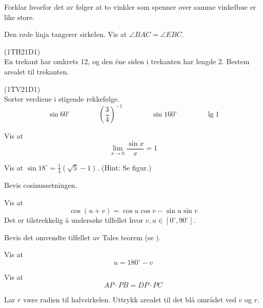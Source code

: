 Forklar hvorfor det av  følger at to vinkler som spenner over samme vinkelbue er like store.

 \vs
{}

\newpage
{}
Den røde linja tangerer sirkelen. Vis at $ \angle BAC=\angle EBC $.

\newpage
{} 
(1TH21D1) \\
En trekant har omkrets 12, og den éne siden i trekanten har lengde 2. Bestem arealet til trekanten.


(1TV21D1)\\
Sorter verdiene i stigende rekkefølge.
\[ \sin 60^\circ\qquad\qquad \left(\frac{3}{4}\right)^{-1}\qquad\qquad\sin 160^\circ\qquad\qquad \lg 1\]

Vis at 
\[\lim\limits_{x\to0} \frac{\sin x}{x}=1 \]


Vis at $ \sin 18^\circ=\frac{1}{4}(\sqrt{5}-1) $. (Hint: Se figur.)


Bevis cosinussetningen.


\newpage
{}
Vis at
\[ \cos(u+v)= \cos u\cos v-\sin u \sin v \]
Det er tilstrekkelig å undersøke tilfellet hvor $ v,u \in [0^\circ, 90^\circ] $.

Bevis det omvendte tilfellet av Tales teorem (se  ).


Vis at
\[ u=180^\circ-v \]

Vis at 
\[ AP\cdot PB = DP\cdot PC \]

\newpage
{}
Lar $ r $ være radien til halvsirkelen. Uttrykk arealet til det blå området ved $ v $ og $ r $.








